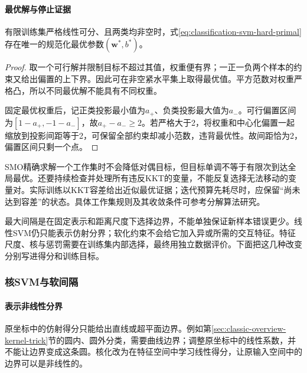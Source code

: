 \paragraph{最优解与停止证据}
\label{sec:classification-svm-analysis}
\label{sec:classification-svm-convergence}
\begin{theorem}[可分硬间隔问题的最优解]
  \label{thm:classification-svm-hard-unique}
  有限训练集严格线性可分、且两类均非空时，式\eqref{eq:classification-svm-hard-primal}存在唯一的规范化最优参数$(\bm w^\ast,b^\ast)$。
\end{theorem}
\begin{proof}
取一个可行解并限制目标不超过其值，权重便有界；一正一负两个样本的约束又给出偏置的上下界。因此可在非空紧水平集上取得最优值。平方范数对权重严格凸，所以不同最优解不能具有不同权重。

固定最优权重后，记正类投影最小值为$a_+$、负类投影最大值为$a_-$。可行偏置区间为$[1-a_+,-1-a_-]$，故$a_+-a_-\geq2$。若严格大于2，将权重和中心化偏置一起缩放到投影间距等于2，可保留全部约束却减小范数，违背最优性。故间距恰为2，偏置区间只剩一个点。
\end{proof}

SMO精确求解一个工作集时不会降低对偶目标，但目标单调不等于有限次到达全局最优。还要持续检查并处理所有违反KKT的变量，不能反复选择无法移动的变量对。实际训练以KKT容差给出近似最优证据；迭代预算先耗尽时，应保留“尚未达到容差”的状态。具体工作集规则及其收敛条件可参考分解算法研究。

最大间隔是在固定表示和距离尺度下选择边界，不能单独保证新样本错误更少。线性SVM仍只能表示仿射分界；软化约束不会给它加入异或所需的交互特征。特征尺度、核与惩罚需要在训练集内部选择，最终用独立数据评价。下面把这几种改变分别写进得分和训练目标。

\subsubsection{核SVM与软间隔}

\paragraph{表示非线性分界}

\label{sec:classification-svm-kernels}

原坐标中的仿射得分只能给出直线或超平面边界。例如第\ref{sec:classic-overview-kernel-trick}节的圆内、圆外分类，需要曲线边界；调整原坐标中的线性系数，并不能让边界变成这条圆。核化改为在特征空间中学习线性得分，让原输入空间中的边界可以是非线性的。

